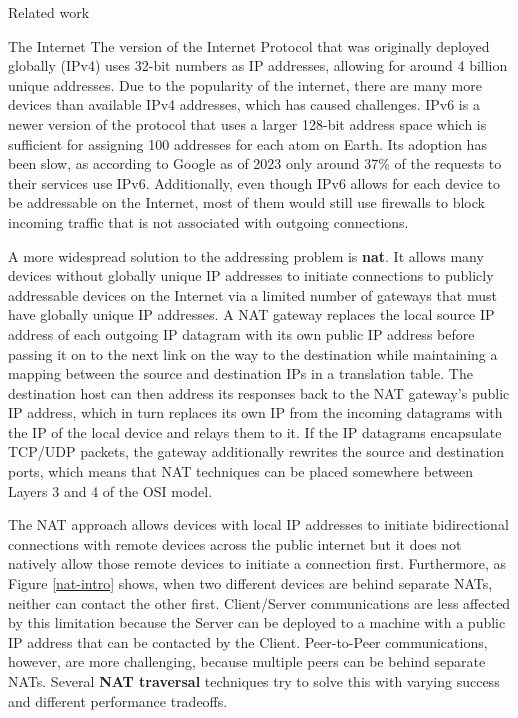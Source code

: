 \begin{frame}[fragile]{Related work}
\begin{block}{The Internet}
The version of the Internet Protocol that was originally deployed
globally (IPv4) uses 32-bit numbers as IP addresses, allowing for around
4 billion unique addresses. Due to the popularity of the internet, there
are many more devices than available IPv4 addresses, which has caused
challenges. IPv6 is a newer version of the protocol that uses a larger
128-bit address space which is sufficient for assigning 100 addresses
for each atom on Earth. Its adoption has been slow, as according to
Google as of 2023 only around 37\% of the requests to their services use
IPv6. Additionally, even though IPv6 allows for each device to be
addressable on the Internet, most of them would still use firewalls to
block incoming traffic that is not associated with outgoing connections.

A more widespread solution to the addressing problem is
\textbf{\gls{nat}}. It allows many devices without globally unique IP
addresses to initiate connections to publicly addressable devices on the
Internet via a limited number of gateways that must have globally unique
IP addresses. A NAT gateway replaces the local source IP address of each
outgoing IP datagram with its own public IP address before passing it on
to the next link on the way to the destination while maintaining a
mapping between the source and destination IPs in a translation table.
The destination host can then address its responses back to the NAT
gateway's public IP address, which in turn replaces its own IP from the
incoming datagrams with the IP of the local device and relays them to
it. If the IP datagrams encapsulate TCP/UDP packets, the gateway
additionally rewrites the source and destination ports, which means that
NAT techniques can be placed somewhere between Layers 3 and 4 of the OSI
model.

The NAT approach allows devices with local IP addresses to initiate
bidirectional connections with remote devices across the public internet
but it does not natively allow those remote devices to initiate a
connection first. Furthermore, as Figure \ref{nat-intro} shows, when two
different devices are behind separate NATs, neither can contact the
other first. Client/Server communications are less affected by this
limitation because the Server can be deployed to a machine with a public
IP address that can be contacted by the Client. Peer-to-Peer
communications, however, are more challenging, because multiple peers
can be behind separate NATs. Several \textbf{NAT traversal} techniques
try to solve this with varying success and different performance
tradeoffs.


\end{block}
\end{frame}
